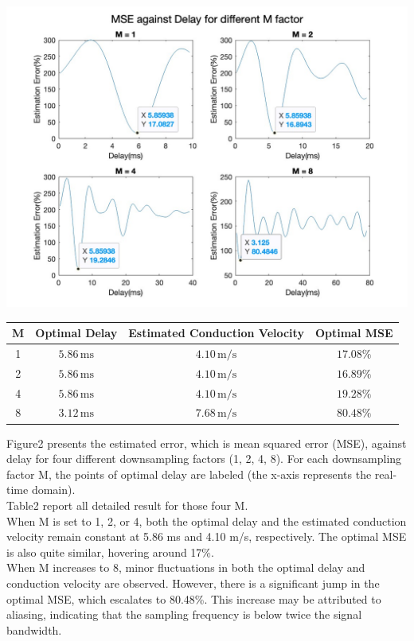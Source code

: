 \documentclass[8pt]{article}  %
\theoremstyle{plain}
\theoremstyle{definition}
\theoremstyle{remark}
\begin{document}
    \begin{minipage}{0.5\textwidth}  
    \centering  
    \includegraphics[width=\linewidth]{figure/figure_2.jpg}  
    \end{minipage}
    \hfill  
    \begin{minipage}{0.48\textwidth}   
    \begin{tabular}{|c|c|c|c|}  %
    \hline
    M& Optimal Delay & Estimated Conduction Velocity & Optimal MSE \\
    \hline
    1 & \(5.86 \, \text{ms}\) & \(4.10 \, \text{m/s}\) & \(17.08\%\) \\
    2 & \(5.86 \, \text{ms}\) & \(4.10 \, \text{m/s}\) & \(16.89\%\) \\
    4 & \(5.86 \, \text{ms}\) & \(4.10 \, \text{m/s}\) & \(19.28\%\) \\
    8 & \(3.12 \, \text{ms}\) & \(7.68 \, \text{m/s}\) & \(80.48\%\) \\
    \hline
    \end{tabular}
    \vspace{0.3cm}
    Figure2 presents the estimated error, which is mean squared error (MSE), against delay for four different downsampling factors (1, 2, 4, 8). 
    For each downsampling factor M, the points of optimal delay are labeled (the x-axis represents the real-time domain). 
    \\
    Table2 report all detailed result for those four M.
    \\
    When M is set to 1, 2, or 4, both the optimal delay and the estimated conduction velocity remain constant at 5.86 ms and 4.10 m/s, respectively. 
    The optimal MSE is also quite similar, hovering around 17\%.
    \\
    When M increases to 8, minor fluctuations in both the optimal delay and conduction velocity are observed. 
    However, there is a significant jump in the optimal MSE, which escalates to 80.48\%. 
    This increase may be attributed to aliasing, indicating that the sampling frequency is below twice the signal bandwidth.
    \end{minipage}
\end{document}
